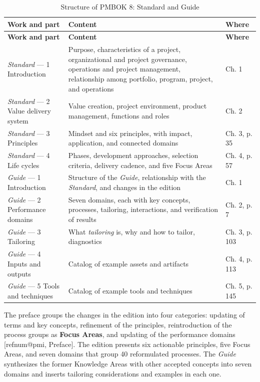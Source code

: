 \documentclass[12pt,a4paper,article,oneside,brazil,english]{abntex2}
\makeatletter
\newcommand{\fontetab}[1]{\par\vspace{3pt}{\small\noindent Source: #1\par}}
\newcommand{\refnum}[1]{\csname refnum@#1\endcsname}
\newcommand{\cit}[1]{[\refnum{#1}]}
\makeatother
\begin{document}
\begingroup\SingleSpacing\small
\begin{longtable}{@{}>{\raggedright\arraybackslash}p{}>{\raggedright\arraybackslash}p{}>{\raggedright\arraybackslash}p{}@{}}
\caption{Structure of PMBOK 8: Standard and Guide}\label{tab:t1}\\
\hline
\textbf{Work and part} & \textbf{Content} & \textbf{Where}\\
\hline
\endfirsthead
\hline
\textbf{Work and part} & \textbf{Content} & \textbf{Where}\\
\hline
\endhead
\hline
\endfoot
\hline
\endlastfoot
\textit{Standard} — 1 Introduction & Purpose, characteristics of a project, organizational and project governance, operations and project management, relationship among portfolio, program, project, and operations & Ch. 1\\[3pt]
\textit{Standard} — 2 Value delivery system & Value creation, project environment, product management, functions and roles & Ch. 2\\[3pt]
\textit{Standard} — 3 Principles & Mindset and six principles, with impact, application, and connected domains & Ch. 3, p. 35\\[3pt]
\textit{Standard} — 4 Life cycles & Phases, development approaches, selection criteria, delivery cadence, and five Focus Areas & Ch. 4, p. 57\\[3pt]
\textit{Guide} — 1 Introduction & Structure of the \textit{Guide}, relationship with the \textit{Standard}, and changes in the edition & Ch. 1\\[3pt]
\textit{Guide} — 2 Performance domains & Seven domains, each with key concepts, processes, tailoring, interactions, and verification of results & Ch. 2, p. 7\\[3pt]
\textit{Guide} — 3 Tailoring & What \textit{tailoring} is, why and how to tailor, diagnostics & Ch. 3, p. 103\\[3pt]
\textit{Guide} — 4 Inputs and outputs & Catalog of example assets and artifacts & Ch. 4, p. 113\\[3pt]
\textit{Guide} — 5 Tools and techniques & Catalog of example tools and techniques & Ch. 5, p. 145\\[3pt]
\end{longtable}
\endgroup
\fontetab{Prepared by the authors (2026), based on \cit{pmi}.}

The preface groups the changes in the edition into four categories: updating of terms and key concepts, refinement of the principles, reintroduction of the process groups as \textbf{Focus Areas}, and updating of the performance domains [\refnum{pmi}, Preface]. The edition presents six actionable principles, five Focus Areas, and seven domains that group 40 reformulated processes. The \textit{Guide} synthesizes the former Knowledge Areas with other accepted concepts into seven domains and inserts tailoring considerations and examples in each one.
\end{document}
